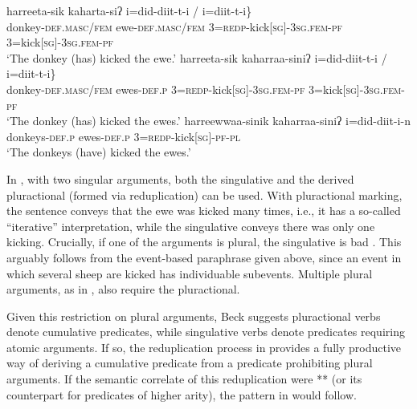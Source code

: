 \documentclass[output=paper]{langscibook}
\begin{document}
\ea\label{has-sch:16}
\ea\label{has-sch:16a}\gll harreeta-sik kaharta-siʔ\hspace{5.4cm} \minsp{\{} i=did-diit-t-i {/} i=diit-t-i\} \\
donkey-\textsc{def.masc/fem} ewe-\textsc{def.masc/fem} {} 3=\textsc{redp}-kick[\textsc{sg}]-\textsc{3sg.fem}-\textsc{pf} {} 3=kick[\textsc{sg}]-\textsc{3sg.fem}-\textsc{pf} {} \\ \hfill 
\glt `The donkey (has) kicked the ewe.' \hfill \citep[Konso; ][(14a), (17a)]{Beck:2012}%
\ex\label{has-sch:16b} \gll harreeta-sik kaharraa-siniʔ \minsp{\{} i=did-diit-t-i  {/} \minsp{*} i=diit-t-i\}\\
donkey-\textsc{def.masc/fem} ewes-\textsc{def.p} {} 3=\textsc{redp}-kick[\textsc{sg}]-\textsc{3sg.fem}-\textsc{pf} {} {} 3=kick[\textsc{sg}]-\textsc{3sg.fem}-\textsc{pf}  {} \\ \hfill
\glt `The donkey (has) kicked the ewes.' \hfill \citep[Konso; ][(14b), (17c)]{Beck:2012}
\ex\label{has-sch:16c} \gll harreewwaa-sinik kaharraa-siniʔ i=did-diit-i-n \\ 
donkeys-\textsc{def.p} ewes-\textsc{def.p} 3=\textsc{redp}-kick[\textsc{sg}]-\textsc{pf}-\textsc{pl} \\ \hfill
\glt `The donkeys (have) kicked the ewes.' \hfill \citep[Konso; ][(14d)]{Beck:2012} \z\z

\noindent  In , with two singular arguments, both the singulative and the derived pluractional (formed via reduplication) can be used. With pluractional marking, the sentence conveys that the ewe was kicked many times, i.e., it has a so-called ``iterative'' interpretation, while the singulative conveys there was only one kicking. Crucially, if one of the arguments is plural, the singulative is bad . This arguably follows from the event-based paraphrase given above, since an event in which several sheep are kicked has individuable subevents. Multiple plural arguments, as in , also require the pluractional.

Given this restriction on plural arguments, Beck suggests pluractional verbs denote cumulative predicates, while singulative verbs denote predicates requiring atomic arguments. If so, the reduplication process  in  provides a fully productive way of deriving a cumulative predicate from a predicate prohibiting plural arguments. If the semantic correlate of this reduplication were **  (or its counterpart for predicates of higher arity), the pattern in  would follow.
\end{document}
